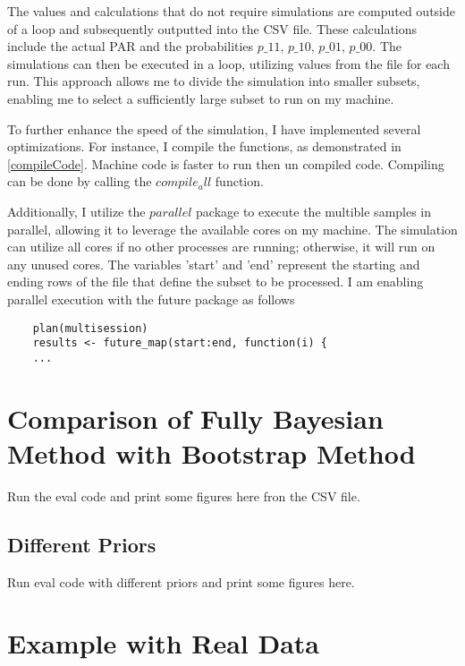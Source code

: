 The values and calculations that do not require simulations are computed outside of a loop and subsequently outputted into the CSV file. These calculations include the actual PAR and the probabilities $p\_11$, $p\_10$, $p\_01$, $p\_00$. The simulations can then be executed in a loop, utilizing values from the file for each run. This approach allows me to divide the simulation into smaller subsets, enabling me to select a sufficiently large subset to run on my machine.

To further enhance the speed of the simulation, I have implemented several optimizations. For instance, I compile the functions, as demonstrated in \ref{compileCode}. Machine code is faster to run then un compiled code. Compiling can be done by calling the $compile_all$ function.

Additionally, I utilize the $parallel$ package to execute the multible samples in parallel, allowing it to leverage the available cores on my machine. The simulation can utilize all cores if no other processes are running; otherwise, it will run on any unused cores. The variables 'start' and 'end' represent the starting and ending rows of the file that define the subset to be processed. I am enabling parallel execution with the future package as follows

\begin{lstlisting}
    plan(multisession)
    results <- future_map(start:end, function(i) {
    ...
\end{lstlisting}

\section{Comparison of Fully Bayesian Method with Bootstrap Method}
Run the eval code and print some figures here fron the CSV file.

\subsection{Different Priors}
Run eval code with different priors and print some figures here.

\section{Example with Real Data}

